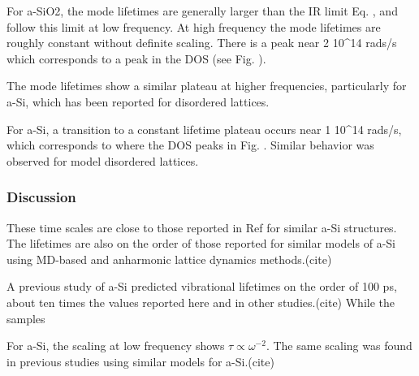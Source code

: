 \documentclass[aps,prb,twocolumn,superscriptaddress,footinbib,amsmath,amssymb,floatfix]{revtex4}
\begin{document}
For a-SiO2, the mode lifetimes are generally larger than the 
IR limit Eq. , and follow this limit at low frequency. 
At high frequency the mode lifetimes are roughly constant 
without definite scaling. There is a peak near 
2 10^{14} rads/s which corresponds to a peak in the DOS (see Fig. ).  

The mode lifetimes show a similar 
plateau at higher frequencies, particularly for a-Si, which has been 
reported for disordered lattices.\cite{larkin_predicting_2013}

For a-Si, a transition to a constant lifetime plateau occurs near 
1 10^{14} rads/s, which corresponds to where the DOS peaks in Fig. . 
Similar behavior was observed for model disordered lattices.
\cite{he_heat_2011,larkin_predicting_2013} 





\subsubsection{\label{S:Life_NMD}Discussion}


These time scales are close to those reported in Ref for similar 
a-Si structures. The lifetimes are also on the order of those
reported for similar models of a-Si using MD-based and anharmonic 
lattice dynamics methods.(cite) 

A previous study of a-Si predicted vibrational lifetimes on the 
order of 100 ps, about ten times the values reported here and in 
other studies.(cite) While the samples 

For a-Si, the scaling at low frequency shows 
$\tau \propto \omega^{-2}$.  The same scaling was found in previous 
studies using similar models for a-Si.(cite) 
\end{document}
